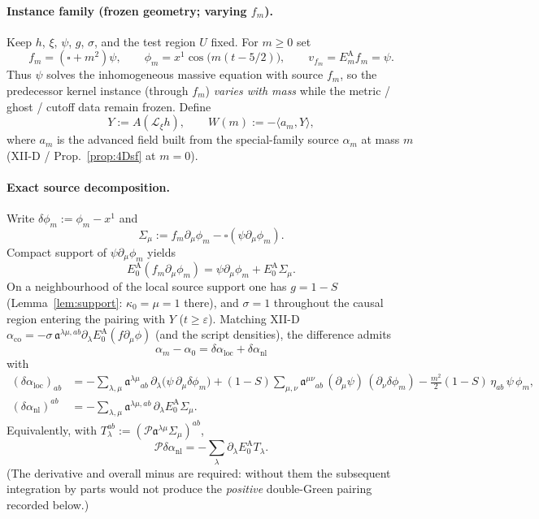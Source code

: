\paragraph{Instance family (frozen geometry; varying $f_m$).}
\label{par:smallmass-family}
Keep $h$, $\xi$, $\psi$, $g$, $\sigma$, and the test region $U$ fixed.
For $m\ge0$ set
\[
f_m=(\square+m^2)\psi,\qquad
\phi_m=x^1\cos\bigl(m(t-5/2)\bigr),\qquad
v_{f_m}=E_m^{\mathrm A}f_m=\psi.
\]
Thus $\psi$ solves the inhomogeneous massive equation with source $f_m$, so the
predecessor kernel instance (through $f_m$) \emph{varies with mass} while the
metric / ghost / cutoff data remain frozen. Define
\[
Y:=A(\mathcal L_\xi h),\qquad
W(m):=-\langle a_m,Y\rangle,
\]
where $a_m$ is the advanced field built from the special-family source $\alpha_m$
at mass $m$ (XII-D / Prop.~\ref{prop:4Dsf} at $m=0$).

\paragraph{Exact source decomposition.}
Write $\delta\phi_m:=\phi_m-x^1$ and
\[
\Sigma_\mu
:=
f_m\partial_\mu\phi_m-\square(\psi\partial_\mu\phi_m).
\]
Compact support of $\psi\partial_\mu\phi_m$ yields
\[
E_0^{\mathrm A}(f_m\partial_\mu\phi_m)
=
\psi\partial_\mu\phi_m+E_0^{\mathrm A}\Sigma_\mu.
\]
On a neighbourhood of the local source support one has $g=1-S$
(Lemma~\ref{lem:support}: $\kappa_0=\mu=1$ there), and $\sigma=1$ throughout the
causal region entering the pairing with $Y$ ($t\ge\varepsilon$). Matching XII-D
$\alpha_{\mathrm{co}}=-\sigma\,\mathfrak a^{\lambda\mu,ab}\partial_\lambda
E_0^{\mathrm A}(f\partial_\mu\phi)$ (and the script densities), the difference
admits
\[
\alpha_m-\alpha_0
=
\delta\alpha_{\mathrm{loc}}+\delta\alpha_{\mathrm{nl}}
\]
with
\begin{align*}
(\delta\alpha_{\mathrm{loc}})_{ab}
&=
-\sum_{\lambda,\mu}
\mathfrak a^{\lambda\mu}{}_{ab}\,
\partial_\lambda\bigl(\psi\,\partial_\mu\delta\phi_m\bigr)
+(1-S)\sum_{\mu,\nu}
\mathfrak a^{\mu\nu}{}_{ab}\,
(\partial_\mu\psi)\,(\partial_\nu\delta\phi_m)
-\tfrac{m^2}{2}(1-S)\,\eta_{ab}\,\psi\,\phi_m,
\\
(\delta\alpha_{\mathrm{nl}})^{ab}
&=
-\sum_{\lambda,\mu}
\mathfrak a^{\lambda\mu,ab}\,
\partial_\lambda E_0^{\mathrm A}\Sigma_\mu.
\end{align*}
Equivalently, with
$T_\lambda^{ab}:=(\mathcal P\mathfrak a^{\lambda\mu}\Sigma_\mu)^{ab}$,
\[
\mathcal P\delta\alpha_{\mathrm{nl}}
=
-\sum_{\lambda}
\partial_\lambda E_0^{\mathrm A}T_\lambda.
\]
(The derivative and overall minus are required: without them the subsequent
integration by parts would not produce the \emph{positive} double-Green pairing
recorded below.)


